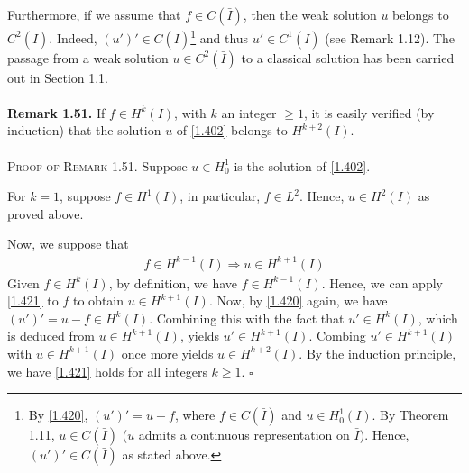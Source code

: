 \documentclass[a4paper,oneside]{article}
\numberwithin{equation}{section}
\begin{document}
Furthermore, if we assume that $f\in C\left(\bar I\right)$, then the weak solution $u$ belongs to $C^2\left(\bar I\right)$. Indeed, $\left(u'\right)'\in C\left(\bar I\right)$\footnote{By \eqref{1.420}, $\left(u'\right)'=u-f$, where $f\in C\left(\bar I\right)$ and $u\in H_0^1\left(I\right)$. By Theorem 1.11, $u\in C\left(\bar I\right)$ ($u$ admits a continuous representation on $\bar I$). Hence, $\left(u'\right)'\in C\left(\bar I\right)$ as stated above.} and thus $u'\in C^1\left(\bar I\right)$ (see Remark 1.12). The passage from a weak solution $u\in C^2\left(\bar I\right)$ to a classical solution has been carried out in Section 1.1.\\
\\
\textbf{Remark 1.51.} If $f\in H^k\left(I\right)$, with $k$ an integer $\ge 1$, it is easily verified (by induction) that the solution $u$ of \eqref{1.402} belongs to $H^{k+2}\left(I\right)$.\\
\\
\textsc{Proof of Remark 1.51.} Suppose $u\in H_0^1$ is the solution of \eqref{1.402}. 

For $k=1$, suppose $f\in H^1\left(I\right)$, in particular, $f\in L^2$. Hence, $u\in H^2\left(I\right)$ as proved above. 

Now, we suppose that 
\begin{align}
\label{1.421}
f \in {H^{k - 1}}\left( I \right) \Rightarrow u \in {H^{k + 1}}\left( I \right)
\end{align}
Given $f\in H^k\left(I\right)$, by definition, we have $f\in H^{k-1}\left(I\right)$. Hence, we can apply \eqref{1.421} to $f$ to obtain $u\in H^{k+1}\left(I\right)$. Now, by \eqref{1.420} again, we have $\left( {u'} \right)' = u - f \in {H^k}\left( I \right)$. Combining this with the fact that $u'\in H^k\left(I\right)$, which is deduced from $u\in H^{k+1}\left(I\right)$, yields $u'\in H^{k+1}\left(I\right)$. Combing $u'\in H^{k+1} \left(I\right)$ with $u\in H^{k+1}\left(I\right)$ once more yields $u\in H^{k+2}\left(I\right)$. By the induction principle, we have \eqref{1.421} holds for all integers $k\ge 1$. \hfill $\square$\\
\end{document}
